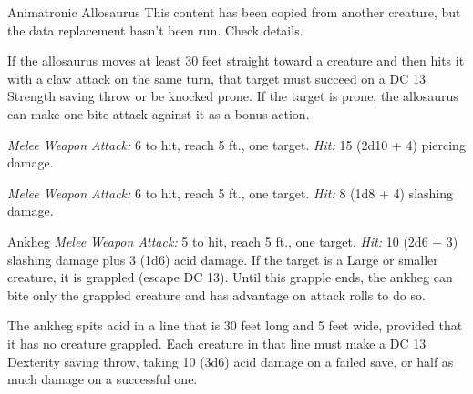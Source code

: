 \documentclass[10pt,a4paper,twoside,bg=print,twocolumn,openany,nodeprecatedcode]{dndbook}
\begin{document}
\begin{DndMonster}[float=t]{Animatronic Allosaurus}
\DndMonsterBasics[
armor-class = {13 (natural armor)},
hit-points = {\DndDice{6d10 + 18}},
speed = {60 ft.}
]
\DndMonsterAbilityScores[
 str = 19,
 dex = 13,
 con = 17,
 int = 2,
 wis = 12,
 cha = 5
]
\DndMonsterDetails[
skills = {Perception +5},
challenge = 2,
]
This content has been copied from another creature, but the data replacement hasn't been run. Check details.

If the allosaurus moves at least 30 feet straight toward a creature and then hits it with a claw attack on the same turn, that target must succeed on a DC 13 Strength saving throw or be knocked prone. If the target is prone, the allosaurus can make one bite attack against it as a bonus action.

\textsl{Melee Weapon Attack:} 6 to hit, reach 5 ft., one target. \textsl{Hit:} 15 (2d10 + 4) piercing damage.

\textsl{Melee Weapon Attack:} 6 to hit, reach 5 ft., one target. \textsl{Hit:} 8 (1d8 + 4) slashing damage.

\end{DndMonster}



\begin{DndMonster}[float=t]{Ankheg}
\DndMonsterBasics[
armor-class = {14 (natural armor) (11 while prone)},
hit-points = {\DndDice{6d10 + 6}},
speed = {30 ft., burrow 10 ft.}
]
\DndMonsterAbilityScores[
 str = 17,
 dex = 11,
 con = 13,
 int = 1,
 wis = 13,
 cha = 6
]
\DndMonsterDetails[
senses = {darkvision 60 ft., tremorsense 60 ft., passive perception 11},
challenge = 2,
]
\textsl{Melee Weapon Attack:} 5 to hit, reach 5 ft., one target. \textsl{Hit:} 10 (2d6 + 3) slashing damage plus 3 (1d6) acid damage. If the target is a Large or smaller creature, it is grappled (escape DC 13). Until this grapple ends, the ankheg can bite only the grappled creature and has advantage on attack rolls to do so.

The ankheg spits acid in a line that is 30 feet long and 5 feet wide, provided that it has no creature grappled. Each creature in that line must make a DC 13 Dexterity saving throw, taking 10 (3d6) acid damage on a failed save, or half as much damage on a successful one.

\end{DndMonster}
\end{document}
